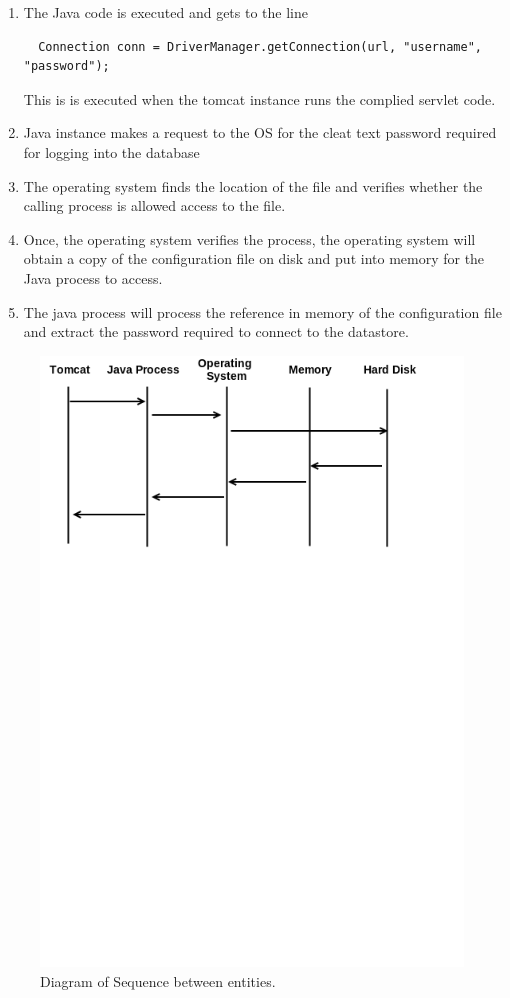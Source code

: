 \documentclass[11pt, a4paper, twoside, openright, notitlepage]{report}
\begin{document}
\begin{enumerate}
\item The Java code is executed and gets to the line
\begin{lstlisting}
  Connection conn = DriverManager.getConnection(url, "username", "password");
\end{lstlisting}
This is is executed when the tomcat instance runs the complied servlet code.
\item Java instance makes a request to the OS for the cleat text password required for logging into the database
\item The operating system finds the location of the file and verifies whether the calling process is allowed access to the file.
\item Once, the operating system verifies the process, the operating system will obtain a copy of the configuration file on disk and put into memory for the Java process to access.
\item The java process will process the reference in memory of the configuration file and extract the password required to connect to the datastore.
\end{enumerate}

\begin{figure}[h!]
    \centering
    \includegraphics[height=0.2\paperheight]{sequence_diagram}
    \caption{Diagram of Sequence between entities.}
\end{figure}
\end{document}
